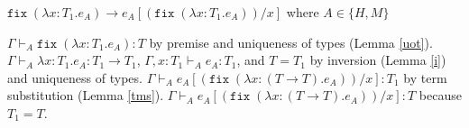 \begin{case}
$\mathtt{fix}\;(\lambda x:T_{1}.e_{A})\rightarrow e_{A}[(\mathtt{fix}\;(\lambda x:T_{1}.e_{A}))/x]$ where $A\in\lbrace H,M\rbrace$

$\Gamma\vdash_{A}\mathtt{fix}\;(\lambda x:T_{1}.e_{A}):T$ by premise and uniqueness of types (Lemma \ref{uot}).  $\Gamma\vdash_{A}\lambda x:T_{1}.e_{A}:T_{1}\rightarrow T_{1}$, $\Gamma,x:T_{1}\vdash_{A}e_{A}:T_{1}$, and $T=T_{1}$ by inversion (Lemma \ref{i}) and uniqueness of types.  $\Gamma\vdash_{A}e_{A}[(\mathtt{fix}\;(\lambda x:(T\rightarrow T).e_{A}))/x]:T_{1}$ by term substitution (Lemma \ref{tms}).  $\Gamma\vdash_{A}e_{A}[(\mathtt{fix}\;(\lambda x:(T\rightarrow T).e_{A}))/x]:T$ because $T_{1}=T$.
\end{case}